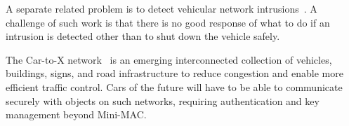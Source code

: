 A separate related problem is to detect vehicular network intrusions~\cite{Otsuka2014}. A challenge of such work is that
there is no good response of what to do if an intrusion is detected other than to shut down the vehicle safely.

The Car-to-X network~\cite{C2X} is an emerging interconnected collection of vehicles, buildings, signs, and road infrastructure 
to reduce congestion and enable more efficient traffic control. Cars of the future will have to be able to communicate
securely with objects on such networks, requiring authentication and key management beyond Mini-MAC.

